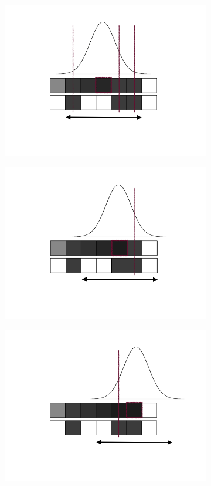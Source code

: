 \begin{figure}
\begin{subfigure}[t]{0.3\linewidth}
    \includegraphics[width=\textwidth]{blurring5.png}
  \end{subfigure}
  \hfill
  \begin{subfigure}[t]{0.3\linewidth}
    \centering
    \includegraphics[width=\textwidth]{blurring6.png}
  \end{subfigure}
  \vfill
  \begin{subfigure}[t]{0.3\linewidth}
    \centering
    \includegraphics[width=\textwidth]{blurring7.png}

\end{subfigure}
\end{figure}

